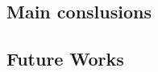 \documentclass[../Main.tex]{subfiles}
\begin{document}
\subsection{Main conslusions}

\subsection{Future Works}


\biblio %
\end{document}
